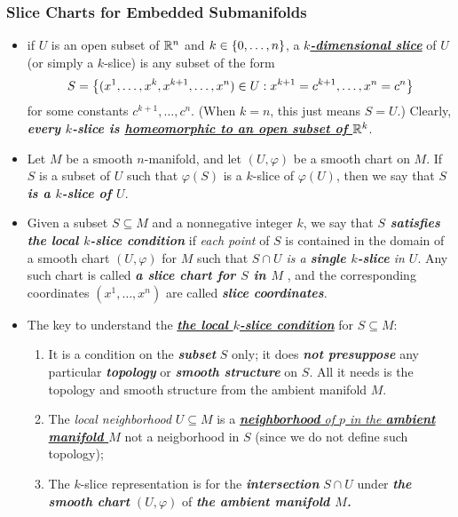 \documentclass[11pt]{article}
\begin{document}
\subsubsection{Slice Charts for Embedded Submanifolds}
\begin{itemize}
\item \begin{definition}
if $U$ is an open subset of ${\mathbb R}^n$ and $k\in \left\{0,\ldots,n\right\}$, a \underline{\emph{\textbf{$k$-dimensional slice}}} of $U$ (or simply a $k$-slice) is any subset of the form 
\begin{align*}
S = \left\{(x^1,\ldots,x^k, x^{k+1},\ldots, x^n) \in U: x^{k+1} = c^{k+1},\ldots, x^n = c^n\right\}
\end{align*} for some constants $c^{k+1},\ldots,c^n$. (When $k = n$, this just means $S = U$.)  Clearly, \emph{\textbf{every $k$-slice is \underline{homeomorphic to an open subset of ${\mathbb R}^k$}}}. 
\end{definition}

\item \begin{definition}
Let $M$ be a smooth $n$-manifold, and let $(U, \varphi)$ be a smooth chart on $M$. If $S$ is a subset of $U$ such that $\varphi(S)$ is a $k$-slice of $\varphi(U)$, then we say that \emph{\textbf{$S$ is a $k$-slice of $U$}}. 
\end{definition}

\item \begin{definition}
Given a subset $S \subseteq M$ and a nonnegative integer $k$, we say that \emph{\textbf{$S$ satisfies the local $k$-slice condition}} if \emph{each point} of $S$ is contained
in the domain of a smooth chart  $(U, \varphi)$ for $M$ such that \emph{$S \cap U$ is a \textbf{single $k$-slice} in $U$}. Any such chart is called \emph{\textbf{a slice chart for $S$ in $M$}} , and the corresponding coordinates $(x^1,\ldots,x^n)$ are called \emph{\textbf{slice coordinates}}.
\end{definition}

\item \begin{remark}
The key to understand the \underline{\emph{\textbf{the local $k$-slice condition}}} for $S \subseteq M$:
\begin{enumerate}
\item It is a condition on the \emph{\textbf{subset}} $S$ only; it does \emph{\textbf{not presuppose}} any particular \emph{\textbf{topology}} or \emph{\textbf{smooth structure}} on $S$. All it needs is the topology and smooth structure from the ambient manifold $M$.
\item The \emph{local neighborhood} $U \subseteq M$ is a \underline{\emph{\textbf{neighborhood} of $p$ in the \textbf{ambient manifold $M$}}} not a neigborhood in $S$ (since we do not define such topology);
\item The $k$-slice representation is for the \emph{\textbf{intersection}} \underline{$S\cap U$} under \emph{\textbf{the smooth chart}} $(U, \varphi)$ of \emph{\textbf{the ambient manifold $M$.}}
\end{enumerate}
\end{remark}


\end{itemize}
\end{document}
